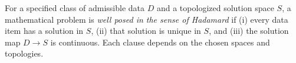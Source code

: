 
For a specified class of admissible data $D$ and a topologized solution space $S$, a mathematical problem is \emph{well posed in the sense of Hadamard} if (i) every data item has a solution in $S$, (ii) that solution is unique in $S$, and (iii) the solution map $D\to S$ is continuous. Each clause depends on the chosen spaces and topologies.
